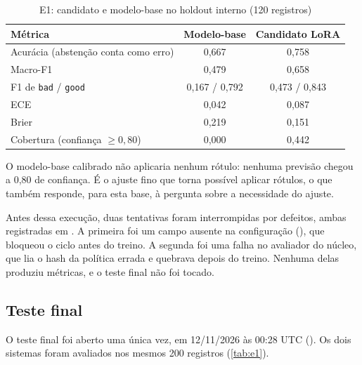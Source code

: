 \begin{table}[htb]
  \centering
  \caption{E1: candidato e modelo-base no holdout interno (120 registros)}
  \label{tab:e1-holdout}
  \begin{tabular}{lcc}
    \toprule
    Métrica & Modelo-base & Candidato LoRA \\
    \midrule
    Acurácia (abstenção conta como erro) & 0,667 & 0,758 \\
    Macro-F1 & 0,479 & 0,658 \\
    F1 de \texttt{bad} / \texttt{good} & 0,167 / 0,792 & 0,473 / 0,843 \\
    ECE & 0,042 & 0,087 \\
    Brier & 0,219 & 0,151 \\
    Cobertura (confiança $\geq 0{,}80$) & 0,000 & 0,442 \\
    \bottomrule
  \end{tabular}
\end{table}

O modelo-base calibrado não aplicaria nenhum rótulo: nenhuma previsão chegou a 0,80 de confiança. É o ajuste fino que torna possível aplicar rótulos, o que também responde, para esta base, à pergunta sobre a necessidade do ajuste.

Antes dessa execução, duas tentativas foram interrompidas por defeitos, ambas registradas em . A primeira foi um campo ausente na configuração (), que bloqueou o ciclo antes do treino. A segunda foi uma falha no avaliador do núcleo, que lia o hash da política errada e quebrava depois do treino. Nenhuma delas produziu métricas, e o teste final não foi tocado.

\subsection{Teste final}

O teste final foi aberto uma única vez, em 12/11/2026 às 00:28 UTC (). Os dois sistemas foram avaliados nos mesmos 200 registros (\autoref{tab:e1}).

